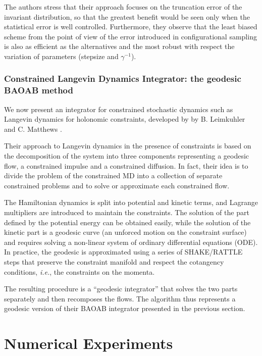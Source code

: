 \documentclass[10pt,a4paper]{book}
\theoremstyle{definition}
\begin{document}
The authors stress that their approach focuses on the truncation error of the invariant distribution, so that the greatest benefit would be seen only when the statistical error is well controlled. Furthermore, they observe that the least biased scheme from the point of view of the error introduced in configurational sampling is also as efficient as the alternatives and the most robust with respect the variation of parameters (stepsize and $\gamma^{-1}$).


\section{Constrained Langevin Dynamics Integrator: the geodesic BAOAB method}
We now present an integrator for constrained stochastic dynamics such as Langevin dynamics for holonomic constraints, developed by by B. Leimkuhler and C. Matthews \cite{Leimkuhler2016}. 

Their approach to Langevin dynamics in the presence of constraints is based on the decomposition of the system into three components representing a geodesic flow, a constrained impulse and a constrained diffusion. In fact, their idea is to divide the problem of the constrained MD into a collection of separate constrained problems and to solve or approximate each constrained flow. 

The Hamiltonian dynamics is split into potential and kinetic terms, and Lagrange multipliers are introduced to maintain the constraints. The solution of the part defined by the potential energy can be obtained easily, while the solution of the kinetic part is a geodesic curve (an unforced motion on the constraint surface) and requires solving a non-linear system of ordinary differential equations (ODE). In practice, the geodesic is approximated using a series of SHAKE/RATTLE steps \cite{ANDERSEN1983,RYCKAERT1977} that preserve the constraint manifold and respect the cotangency conditions, \textit{i.e.}, the constraints on the momenta. 

The resulting procedure is a ``geodesic integrator'' that solves the two parts separately and then recomposes the flows.
The algorithm thus represents a geodesic version of their BAOAB integrator presented in the previous section.


\part{Numerical Experiments}
\label{Sec:NumExp}
\end{document}
